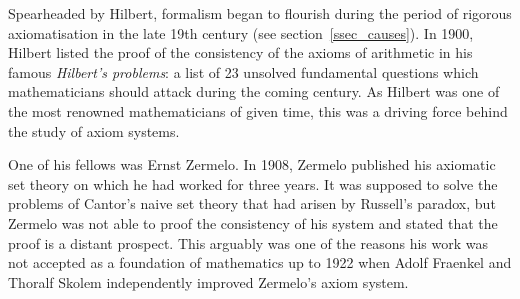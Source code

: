 \documentclass[hidelinks]{article}
\begin{document}
Spearheaded by Hilbert, formalism began to flourish during the period of rigorous axiomatisation in the late 19th century (see section~\ref{ssec_causes}). 
In 1900, Hilbert listed the proof of the consistency of the axioms of arithmetic in his famous \textit{Hilbert's problems}: a list of 23 unsolved fundamental questions which mathematicians should attack during the coming century. As Hilbert was one of the most renowned mathematicians of given time, this was a driving force behind the study of axiom systems.

One of his fellows was Ernst Zermelo. In 1908, Zermelo published his axiomatic set theory on which he had worked for three years. It was supposed to solve the problems of Cantor's naive set theory that had arisen by Russell's paradox, but Zermelo was not able to proof the consistency of his system and stated that the proof is a distant prospect. This arguably was one of the reasons his work was not accepted as a foundation of mathematics up to 1922 when Adolf Fraenkel and Thoralf Skolem independently improved Zermelo's axiom system. 
\end{document}
